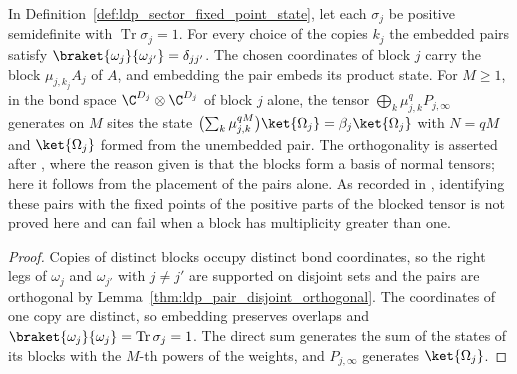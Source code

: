 \begin{lemma}
    \label{thm:ldp_local_orthogonality}
    \leanok
    In Definition~\ref{def:ldp_sector_fixed_point_state}, let each $\sigma_j$ be
    positive semidefinite with $\operatorname{Tr}\sigma_j=1$. For every choice
    of the copies $k_j$ the embedded pairs satisfy
    $\braket{\omega_j}{\omega_{j'}}=\delta_{jj'}$. The chosen coordinates of
    block $j$ carry the block $\mu_{j,k_j}A_j$ of $A$, and embedding the pair
    embeds its product state. For $M\geq1$, in the bond space
    $\C^{D_j}\otimes\C^{D_j}$ of block $j$ alone, the tensor
    $\bigoplus_k\mu_{j,k}^qP_{j,\infty}$ generates on $M$ sites the state
    $\bigl(\sum_k\mu_{j,k}^{qM}\bigr)\ket{\Omega_j}=\beta_j\ket{\Omega_j}$ with
    $N=qM$ and $\ket{\Omega_j}$ formed from the unembedded pair. The
    orthogonality is asserted after \cite[eq.~(S7)]{Malz2024Preparation},
    where the reason given is that the blocks form a basis of normal tensors;
    here it follows from the placement of the pairs alone. As recorded in
    \cite{gap:mswc24_ghz_form_local_orthogonality}, identifying
    these pairs with the fixed points of the positive parts of the blocked
    tensor is not proved here and can fail when a block has multiplicity
    greater than one.
\end{lemma}

\begin{proof}
    \leanok
    Copies of distinct blocks occupy distinct bond coordinates, so the right
    legs of $\omega_j$ and $\omega_{j'}$ with $j\neq j'$ are supported on
    disjoint sets and the pairs are orthogonal by
    Lemma~\ref{thm:ldp_pair_disjoint_orthogonal}. The coordinates of one
    copy are distinct, so embedding preserves overlaps and
    $\braket{\omega_j}{\omega_j}=\operatorname{Tr}\sigma_j=1$. The direct sum
    generates the sum of the states of its blocks with the $M$-th powers of the
    weights, and $P_{j,\infty}$ generates $\ket{\Omega_j}$.
\end{proof}

